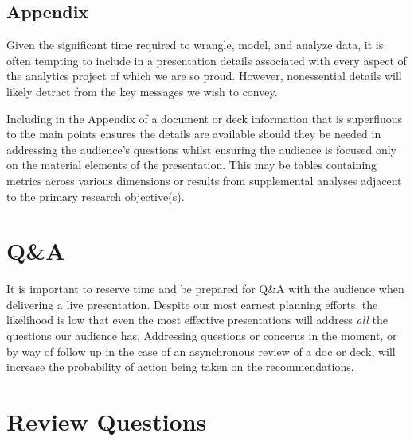 \documentclass[
]{book}
\begin{document}
\hypertarget{appendix}{%
\subsection{Appendix}\label{appendix}}

Given the significant time required to wrangle, model, and analyze data, it is often tempting to include in a presentation details associated with every aspect of the analytics project of which we are so proud. However, nonessential details will likely detract from the key messages we wish to convey.

Including in the Appendix of a document or deck information that is superfluous to the main points ensures the details are available should they be needed in addressing the audience's questions whilst ensuring the audience is focused only on the material elements of the presentation. This may be tables containing metrics across various dimensions or results from supplemental analyses adjacent to the primary research objective(s).

\hypertarget{qa}{%
\section{Q\&A}\label{qa}}

It is important to reserve time and be prepared for Q\&A with the audience when delivering a live presentation. Despite our most earnest planning efforts, the likelihood is low that even the most effective presentations will address \emph{all} the questions our audience has. Addressing questions or concerns in the moment, or by way of follow up in the case of an asynchronous review of a doc or deck, will increase the probability of action being taken on the recommendations.

\hypertarget{review-questions-14}{%
\section{Review Questions}\label{review-questions-14}}
\end{document}

